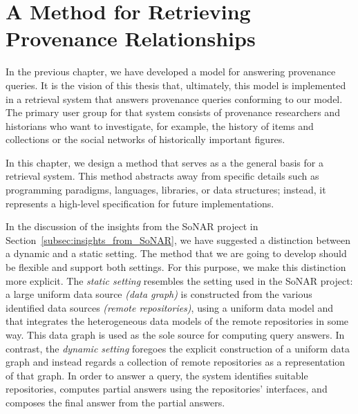 \chapter{A Method for Retrieving Provenance Relationships}
\label{chap:retrieval}
\label{chap:method}

In the previous chapter, 
we have developed a model for answering provenance queries.
It is the vision of this thesis that, ultimately,
this model is implemented 
in a retrieval system
that answers provenance queries conforming to our model.
The primary user group for that system consists of provenance researchers
and historians who want to investigate, for example, the history of
items and collections or the social networks of historically important figures.

In this chapter, we design a method that serves
as a the general basis for a retrieval system.
This method abstracts away from specific details such as 
programming paradigms, languages, libraries, or data structures;
instead, it represents a high-level specification
for future implementations.

In the discussion of the insights from the \gls{SoNAR} project
in Section~\ref{subsec:insights_from_SoNAR},
we have suggested a distinction between a dynamic and a static setting.
The method that we are going to develop should be flexible
and support both settings.
For this purpose, we make this distinction more explicit.
The \emph{static setting} resembles the setting used in the SoNAR project:
a large uniform data source \emph{(data graph)} is constructed
from the various identified data sources \emph{(remote repositories)},
using a uniform data model and that integrates the heterogeneous data models
of the remote repositories in some way. This data graph is 
used as the sole source for computing query answers.
In contrast, the \emph{dynamic setting} foregoes
the explicit construction of a uniform data graph and instead
regards a collection of remote repositories as a representation of that
graph. In order to answer a query, the system identifies
suitable repositories, computes partial answers using the repositories' interfaces,
and composes the final answer from the partial answers.

